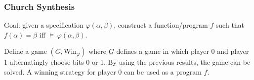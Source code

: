 \documentclass{article}
\begin{document}
\subsubsection{Church Synthesis}
Goal: given a specification $\varphi(\alpha, \beta)$, construct a function/program $f$ such that $f(\alpha) = \beta $ iff $\models~\varphi(\alpha, \beta)$.

Define a game $(G, \text{Win}_\varphi)$ where $G$ defines a game in which player 0 and player 1 alternatingly choose bits 0 or 1. By using the previous results, the game can be solved. A winning strategy for player 0 can be used as a program $f$.
\end{document}
